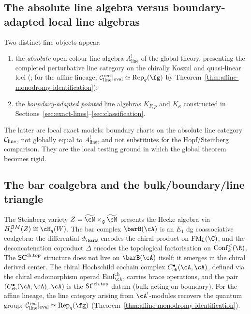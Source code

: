 \subsection{The absolute line algebra versus boundary-adapted local line algebras}

Two distinct line objects appear:
\begin{enumerate}[label=(\roman*),leftmargin=1.8em]
\item the \emph{absolute} open-colour line algebra
$A^!_{\mathrm{line}}$ of the global theory, presenting the completed
perturbative line category on the chirally Koszul and quasi-linear
loci (\cite{DNP25}; for the affine lineage,
$\cC_{\mathrm{line}}^{\mathrm{red}}|_{\mathrm{eval}} \simeq
\mathrm{Rep}_q(\fg)$ by
Theorem~\ref{thm:affine-monodromy-identification});
\item the \emph{boundary-adapted pointed} line algebras $K_{F,p}$ and $K_\kappa$ constructed in Sections~\ref{sec:exact-lines}--\ref{sec:classification}.
\end{enumerate}
The latter are local exact models: boundary charts on the absolute line
category $\mathcal C_{\mathrm{line}}$, not globally equal to
$A^!_{\mathrm{line}}$, and not substitutes for the Hopf/Steinberg
comparison. They are the local testing ground in which the global
theorem becomes rigid.

\subsection{The bar coalgebra and the bulk/boundary/line triangle}

The Steinberg variety $Z = \widetilde{\cN} \times_{\mathfrak g}
\widetilde{\cN}$ presents the Hecke algebra via
$H_*^{BM}(Z) \cong \cH_q(W)$. The bar complex $\barB(\cA)$ is
an $E_1$ dg coassociative coalgebra: the differential $d_{\barB}$
encodes the chiral product on $\FM_k(\C)$, and the deconcatenation
coproduct $\Delta$ encodes the topological factorisation on
$\Conf_k^{<}(\R)$. The $\mathsf{SC}^{\mathrm{ch,top}}$ structure does not live on
$\barB(\cA)$ itself; it emerges in the chiral derived center.
The chiral Hochschild cochain complex
$C^\bullet_{\mathrm{ch}}(\cA,\cA)$, defined via the chiral
endomorphism operad $\mathrm{End}^{\mathrm{ch}}_{\cA}$, carries brace
operations, and the pair $(C^\bullet_{\mathrm{ch}}(\cA,\cA),\,\cA)$
is the $\mathsf{SC}^{\mathrm{ch,top}}$ datum (bulk acting on boundary). For the affine
lineage, the line category arising from $\cA^!$-modules recovers the
quantum group:
$\cC_{\mathrm{line}}^{\mathrm{red}}|_{\mathrm{eval}} \simeq
\mathrm{Rep}_q(\fg)$
(Theorem~\ref{thm:affine-monodromy-identification}).

